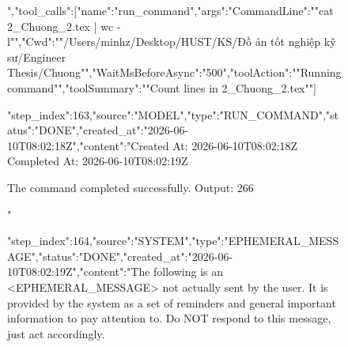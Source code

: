\begin{figure}[htbp]
{{{{","tool_calls":[{"name":"run_command","args":{"CommandLine":""cat 2_Chuong_2.tex | wc -l"","Cwd":""/Users/minhz/Desktop/HUST/KS/Đồ án tốt nghiệp kỹ sư/Engineer Thesis/Chuong"","WaitMsBeforeAsync":"500","toolAction":""Running command"","toolSummary":""Count lines in 2_Chuong_2.tex""}}]}
{"step_index":163,"source":"MODEL","type":"RUN_COMMAND","status":"DONE","created_at":"2026-06-10T08:02:18Z","content":"Created At: 2026-06-10T08:02:18Z
Completed At: 2026-06-10T08:02:19Z

				The command completed successfully.
				Output:
				     266

"}
{"step_index":164,"source":"SYSTEM","type":"EPHEMERAL_MESSAGE","status":"DONE","created_at":"2026-06-10T08:02:19Z","content":"The following is an <EPHEMERAL_MESSAGE> not actually sent by the user. It is provided by the system as a set of reminders and general important information to pay attention to. Do NOT respond to this message, just act accordingly.

}}}}
\end{figure}
